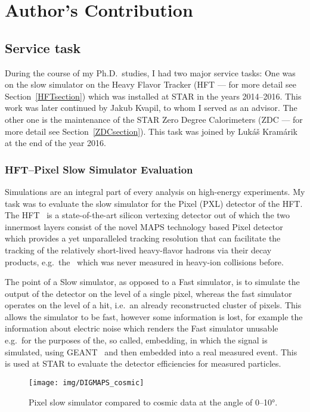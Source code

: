\chapter*{Author's Contribution}

\section*{Service task}
During the course of my Ph.D.\ studies, I had two major service tasks: One was on the slow simulator on the Heavy Flavor Tracker (HFT --- for more detail see Section~\ref{HFTsection}) which was installed at STAR in the years 2014--2016. This work was later continued by Jakub Kvapil, to whom I served as an advisor. The other one is the maintenance of the STAR Zero Degree Calorimeters (ZDC --- for more detail see Section~\ref{ZDCsection}). This task was joined by Lukáš Kramárik at the end of the year 2016.

\subsection*{HFT--Pixel Slow Simulator Evaluation}
Simulations are an integral part of every analysis on high-energy experiments. My task was to evaluate the slow simulator for the Pixel (PXL) detector of the HFT\@. The HFT~\cite{HftTdr, HFTLeo, HftFinal} is a state-of-the-art silicon vertexing detector out of which the two innermost layers consist of the novel MAPS technology based Pixel detector which provides a yet unparalleled tracking resolution that can facilitate the tracking of the relatively short-lived heavy-flavor hadrons via their decay products, e.g.\ the \Lambdac\ which was never measured in heavy-ion collisions before.

The point of a Slow simulator, as opposed to a Fast simulator, is to simulate the output of the detector on the level of a single pixel, whereas the fast simulator operates on the level of a hit, i.e.\ an already reconstructed cluster of pixels. This allows the simulator to be fast, however some information is lost, for example the information about electric noise which renders the Fast simulator unusable e.g.\ for the purposes of the, so called, embedding, in which the signal is simulated, using GEANT~\cite{GEANT} and then embedded into a real measured event.
This is used at STAR to evaluate the detector efficiencies for measured particles.

\begin{figure}[htb]
\begin{center}
 \texttt{[image: img/DIGMAPS\_cosmic]}\\
\end{center}
\caption{\label{cosmicDigmaps}Pixel slow simulator compared to cosmic data at the angle of 0--10°.}
\end{figure}

